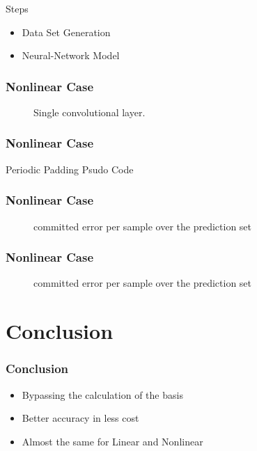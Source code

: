 \documentclass{beamer}
\begin{document}
\begin{frame}
	\frametitle{}	
	\begin{block}{Steps}
		\begin{itemize}
			\item  Data Set Generation 
			\item  Neural-Network Model
		\end{itemize}	
	\end{block}
\end{frame}

\begin{frame}
	\frametitle{Nonlinear Case}
	
	\begin{figure}[h!]
		{
			\centering
			\def\svgwidth{\columnwidth}
			\scalebox{1}{}
			\caption{Single convolutional layer.}
		}
	\end{figure}	
\end{frame}

\begin{frame}
	\frametitle{Nonlinear Case}
	\begin{block}{Periodic Padding Psudo Code}
	\end{block}
\end{frame}


\begin{frame}
	\frametitle{Nonlinear Case}
	\begin{figure}[h!]
		{
			\centering
			\def\svgwidth{\columnwidth}
			\scalebox{.5}{}
			\caption{committed error per sample over the prediction set}
		}
	\end{figure}	
\end{frame} 
\begin{frame}
	\frametitle{Nonlinear Case}
	\begin{figure}[h!]
		{
			\centering
			\def\svgwidth{\columnwidth}
			\scalebox{.5}{}
			\caption{committed error per sample over the prediction set}
		}
	\end{figure}	
\end{frame} 



\section{Conclusion}
\begin{frame}
	\frametitle{Conclusion}
	\begin{itemize}
		\item <1- > Bypassing the calculation of the basis
		\item <2- > Better accuracy in less cost
		\item <3- > Almost the same for Linear and Nonlinear
	\end{itemize}
\end{frame}
\end{document}

